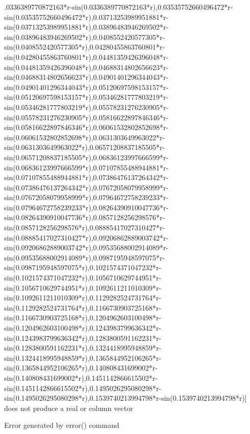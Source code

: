 \documentclass{article}
\begin{document}
\begin{eulernotebook}
\begin{eulercomment}
\begin{eulercomment}
\begin{eulercomment}
\begin{eulercomment}
\begin{eulercomment}
\begin{eulercomment}
\begin{eulercomment}
\begin{eulercomment}
\begin{eulercomment}
\begin{eulercomment}
\begin{eulercomment}
\begin{eulercomment}
\begin{eulercomment}
\begin{eulercomment}
\begin{eulercomment}
\begin{eulercomment}
\begin{eulercomment}
\begin{eulercomment}
\begin{euleroutput}
.0336389770872163*r-sin(0.0336389770872163*r),0.03535752660496472*r-sin(0.03535752660496472*r),0.03713253989951881*r-sin(0.03713253989951881*r),0.03896483946269502*r-sin(0.03896483946269502*r),0.0408552420577305*r-sin(0.0408552420577305*r),0.04280455863760801*r-sin(0.04280455863760801*r),0.04481359426396048*r-sin(0.04481359426396048*r),0.04688314802656623*r-sin(0.04688314802656623*r),0.04901401296344043*r-sin(0.04901401296344043*r),0.05120697598153157*r-sin(0.05120697598153157*r),0.05346281777803219*r-sin(0.05346281777803219*r),0.05578231276230905*r-sin(0.05578231276230905*r),0.05816622897846346*r-sin(0.05816622897846346*r),0.06061532802852698*r-sin(0.06061532802852698*r),0.0631303649963022*r-sin(0.0631303649963022*r),0.06571208837185505*r-sin(0.06571208837185505*r),0.06836123997666599*r-sin(0.06836123997666599*r),0.07107855488944881*r-sin(0.07107855488944881*r),0.07386476137264342*r-sin(0.07386476137264342*r),0.07672058079958999*r-sin(0.07672058079958999*r),0.07964672758239233*r-sin(0.07964672758239233*r),0.08264390910047736*r-sin(0.08264390910047736*r),0.0857128256298576*r-sin(0.0857128256298576*r),0.08885417027310427*r-sin(0.08885417027310427*r),0.09206862889003742*r-sin(0.09206862889003742*r),0.09535688002914089*r-sin(0.09535688002914089*r),0.0987195948597075*r-sin(0.0987195948597075*r),0.1021574371047232*r-sin(0.1021574371047232*r),0.1056710629744951*r-sin(0.1056710629744951*r),0.1092611211010309*r-sin(0.1092611211010309*r),0.1129282524731764*r-sin(0.1129282524731764*r),0.1166730903725168*r-sin(0.1166730903725168*r),0.1204962603100498*r-sin(0.1204962603100498*r),0.1243983799636342*r-sin(0.1243983799636342*r),0.1283800591162231*r-sin(0.1283800591162231*r),0.1324418995948859*r-sin(0.1324418995948859*r),0.1365844952106265*r-sin(0.1365844952106265*r),0.140808431699002*r-sin(0.140808431699002*r),0.1451142866615502*r-sin(0.1451142866615502*r),0.1495026295080298*r-sin(0.1495026295080298*r),0.1539740213994798*r-sin(0.1539740213994798*r)] does not produce a real or column vector
  
  Error generated by error() command
  

\end{euleroutput}
\end{eulercomment}
\end{eulercomment}
\end{eulercomment}
\end{eulercomment}
\end{eulercomment}
\end{eulercomment}
\end{eulercomment}
\end{eulercomment}
\end{eulercomment}
\end{eulercomment}
\end{eulercomment}
\end{eulercomment}
\end{eulercomment}
\end{eulercomment}
\end{eulercomment}
\end{eulercomment}
\end{eulercomment}
\end{eulercomment}
\end{eulernotebook}
\end{document}
